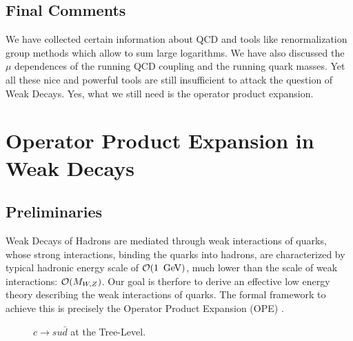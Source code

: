 \documentclass[12pt]{article}
\newcommand{\gev}{\, {\rm GeV}}
\newcommand{\ord}{{\cal O}}
\begin{document}
\begin{itemize}
\begin{itemize}
\subsection{Final Comments}
We have collected certain information about QCD and tools
like  renormalization group methods
which allow to sum large logarithms. We have also discussed
the $\mu$ dependences of the running QCD coupling and the running
quark masses. Yet all these nice and powerful tools are still
insufficient to attack the question of Weak Decays. Yes, what we
still need is the operator product expansion.

\section{Operator Product Expansion in Weak Decays}
            \label{sec:basicform:prelim}
\setcounter{equation}{0}
\subsection{Preliminaries}
Weak Decays of Hadrons are mediated through weak interactions of quarks,
whose strong interactions, binding the quarks into hadrons, are
characterized by typical hadronic energy scale of $\ord (1~\gev)$,
much lower than the
scale of weak interactions: $\ord (M_{W,Z})$.
Our goal is therfore to  derive
an effective low energy theory describing the weak interactions of
quarks. 
The formal framework to achieve this is precisely the 
Operator Product Expansion (OPE) \cite{OPE,ZIMM,WIT}. 
\begin{figure}[hbt]
\vspace{0.10in}
\centerline{
\epsfysize=2in
}%
\vspace{0.08in}
\caption[]{$c\to su\bar d$ at the Tree-Level.
\label{L:4}}
\end{figure}


\end{itemize}
\end{itemize}
\end{document}

